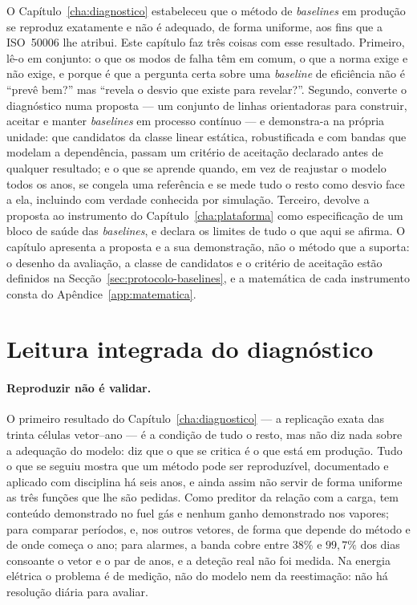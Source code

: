 O Capítulo~\ref{cha:diagnostico} estabeleceu que o método de \emph{baselines}
em produção se reproduz exatamente e não é adequado, de forma uniforme, aos
fins que a ISO~50006 lhe atribui. Este capítulo faz três coisas com esse
resultado. Primeiro, lê-o em conjunto: o que os modos de falha têm em
comum, o que a norma exige e não exige, e porque é que a pergunta certa
sobre uma \emph{baseline} de eficiência não é ``prevê bem?'' mas ``revela o
desvio que existe para revelar?''. Segundo, converte o diagnóstico numa
proposta --- um conjunto de linhas orientadoras para construir, aceitar e
manter \emph{baselines} em processo contínuo --- e demonstra-a na própria
unidade: que candidatos da classe linear estática, robustificada e com
bandas que modelam a dependência, passam um critério de aceitação declarado antes de
qualquer resultado; e o que se aprende quando, em vez de reajustar o modelo
todos os anos, se congela uma referência e se mede tudo o resto como desvio
face a ela, incluindo com verdade conhecida por simulação. Terceiro,
devolve a proposta ao instrumento do Capítulo~\ref{cha:plataforma} como
especificação de um bloco de saúde das \emph{baselines}, e declara os
limites de tudo o que aqui se afirma. O capítulo apresenta a proposta e a sua
demonstração, não o método que a suporta: o desenho da avaliação, a classe de
candidatos e o critério de aceitação estão definidos na
Secção~\ref{sec:protocolo-baselines}, e a matemática de cada instrumento
consta do Apêndice~\ref{app:matematica}.

\section{Leitura integrada do diagnóstico}
\label{sec:leitura-integrada}

\paragraph{Reproduzir não é validar.} O primeiro resultado do
Capítulo~\ref{cha:diagnostico} --- a replicação exata das trinta células
vetor--ano --- é a condição de tudo o resto, mas não diz nada sobre a
adequação do modelo: diz que o que se critica é o que está em produção.
Tudo o que se seguiu mostra que um método pode ser reproduzível, documentado
e aplicado com disciplina há seis anos, e ainda assim não servir de forma
uniforme as três funções que lhe são pedidas. Como preditor da relação com a
carga, tem conteúdo demonstrado no fuel gás e nenhum ganho demonstrado nos
vapores; para comparar períodos,  e, nos outros vetores, de forma que depende do método e de
onde começa o ano; para alarmes, a banda cobre entre $38\%$ e $99{,}7\%$ dos
dias consoante o vetor e o par de anos, e a deteção real não foi medida. Na
energia elétrica o problema é de medição, não do modelo nem da
reestimação: não há resolução diária para avaliar.

